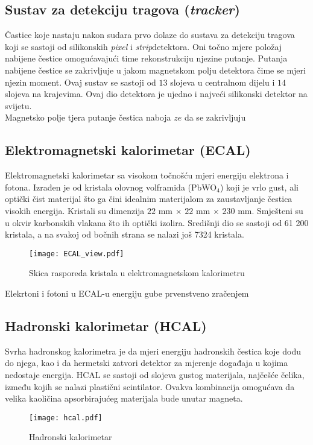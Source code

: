 \documentclass[a4paper,12pt]{report}
\begin{document}
\subsection{Sustav za detekciju tragova (\textit{tracker})}
\label{tracker}
Častice koje nastaju nakon sudara prvo dolaze do sustava za detekciju tragova koji se sastoji od silikonskih \textit{pixel} i \textit{strip}detektora. Oni točno mjere položaj nabijene čestice omogućavajući time rekonstrukciju njezine putanje.  Putanja nabijene čestice se zakrivljuje u jakom magnetskom polju detektora čime se mjeri njezin moment. 
Ovaj sustav se sastoji od $13$ slojeva u centralnom dijelu i $14$ slojeva na krajevima. Ovaj dio detektora je ujedno i najveći silikonski detektor na svijetu. \\
Magnetsko polje tjera putanje čestica naboja $ze$ da se zakrivljuju



\subsection{Elektromagnetski kalorimetar (ECAL)}
\label{ECAL}
Elektromagnetski kalorimetar sa visokom točnošću mjeri energiju elektrona i fotona.  Izrađen je od kristala olovnog volframida (PbWO$_4$) koji je vrlo gust, ali optički čist materijal što ga čini idealnim materijalom za zaustavljanje čestica visokih energija.  Kristali su dimenzija $22$ mm $\times$ $22$ mm $\times$ $230$ mm. Smješteni su u okvir karbonskih vlakana što ih optički izolira. Središnji dio se sastoji od 61 200 kristala, a na svakoj od bočnih strana se nalazi još 7324 kristala. \\
\begin{figure}%
\centering
\texttt{[image: ECAL\_view.pdf]}%
\caption{Skica rasporeda kristala u elektromagnetskom kalorimetru}%
\label{fig:ecal}%
\end{figure}
Elekrtoni i fotoni u ECAL-u energiju gube prvenstveno zračenjem

\subsection{Hadronski kalorimetar (HCAL)}
\label{HCAL}
Svrha hadronskog kalorimetra je da mjeri energiju hadronskih čestica koje dođu do njega, kao i da hermetski zatvori detektor za mjerenje događaja u kojima nedostaje energija. HCAL se sastoji od slojeva gustog materijala, najčešće čelika, između kojih se nalazi plastični scintilator. Ovakva kombinacija omogućava da velika kaoličina apsorbirajućeg materijala bude unutar magneta.
\begin{figure}%
\centering
\texttt{[image: hcal.pdf]}%
\caption{Hadronski kalorimetar}%
\label{fig:hcal}%
\end{figure}
\end{document}
